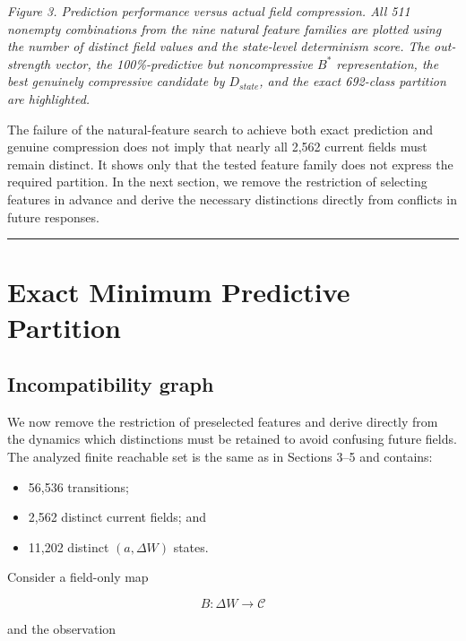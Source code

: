 \documentclass[
  11pt,
]{article}
\providecommand{\tightlist}{%
  \setlength{\itemsep}{0pt}\setlength{\parskip}{0pt}}
\begin{document}
\emph{Figure 3. Prediction performance versus actual field compression.
All 511 nonempty combinations from the nine natural feature families are
plotted using the number of distinct field values and the state-level
determinism score. The out-strength vector, the 100\%-predictive but
noncompressive \(B^\ast\) representation, the best genuinely compressive
candidate by \(D_{state}\), and the exact 692-class partition are
highlighted.}

The failure of the natural-feature search to achieve both exact
prediction and genuine compression does not imply that nearly all 2,562
current fields must remain distinct. It shows only that the tested
feature family does not express the required partition. In the next
section, we remove the restriction of selecting features in advance and
derive the necessary distinctions directly from conflicts in future
responses.

\begin{center}\rule{0.5\linewidth}{0.5pt}\end{center}

\hypertarget{exact-minimum-predictive-partition}{%
\section{Exact Minimum Predictive
Partition}\label{exact-minimum-predictive-partition}}

\hypertarget{incompatibility-graph}{%
\subsection{Incompatibility graph}\label{incompatibility-graph}}

We now remove the restriction of preselected features and derive
directly from the dynamics which distinctions must be retained to avoid
confusing future fields. The analyzed finite reachable set is the same
as in Sections 3--5 and contains:

\begin{itemize}
\tightlist
\item
  56,536 transitions;
\item
  2,562 distinct current fields; and
\item
  11,202 distinct \({(a,\Delta W)}\) states.
\end{itemize}

Consider a field-only map

\[{B:\Delta W\longrightarrow\mathcal C}\]

and the observation
\end{document}
